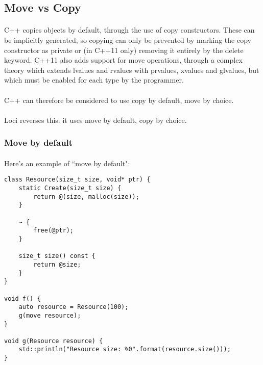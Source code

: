 \documentclass[12pt,twoside,notitlepage]{report}
\begin{document}
\clearpage

\subsection{Move vs Copy}

\paragraph{}
C++ copies objects by default, through the use of copy constructors. These can be implicitly generated, so copying can only be prevented by marking the copy constructor as private or (in C++11 only) removing it entirely by the delete keyword. C++11 also adds support for move operations, through a complex theory which extends lvalues and rvalues with prvalues, xvalues and glvalues, but which must be enabled for each type by the programmer.

\paragraph{}
C++ can therefore be considered to use copy by default, move by choice.

\paragraph{}
Loci reverses this: it uses move by default, copy by choice.

\subsubsection{Move by default}

\paragraph{}
Here’s an example of ``move by default":

\begin{lstlisting}
class Resource(size_t size, void* ptr) {
	static Create(size_t size) {
		return @(size, malloc(size));
	}
	
	~ {
		free(@ptr);
	}
	
	size_t size() const {
		return @size;
	}
}

void f() {
	auto resource = Resource(100);
	g(move resource);
}

void g(Resource resource) {
	std::println("Resource size: %0".format(resource.size()));
}
\end{lstlisting}
\end{document}
